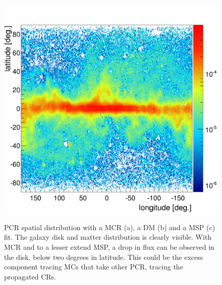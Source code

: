 \begin{figure}[h]
\begin{minipage}[h]{0.45\textwidth}
	  \label{}
  \end{minipage}
  \hfill
  \begin{minipage}[h]{0.45\textwidth}
	  \centering
	  \includegraphics[width=1.\linewidth]{pic/discussion/MSPonly_fine_PCR_integral_distribution.png}
	  \label{}
  \end{minipage}
  \caption[PCR spatial distributions.]{PCR spatial distribution with a MCR (a), a DM (b) and a MSP (c) fit. The galaxy disk and matter distribution is clearly visible. With MCR and to a lesser extend MSP, a drop in flux can be observed in the disk, below two degrees in latitude. This could be the excess component tracing MCs that take other PCR, tracing the propagated CRs.}
  \label{fig:PCR_flux_distrib_excess_comp}	 
\end{figure}


\newpage
